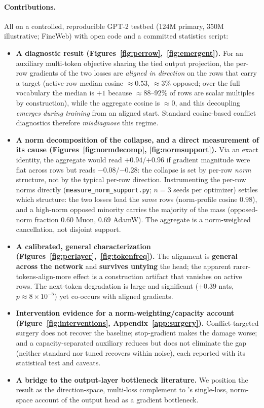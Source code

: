 \documentclass{article}
\begin{document}
\paragraph{Contributions.} All on a controlled, reproducible GPT-2 testbed (124M
primary, 350M illustrative; FineWeb) with open code and a committed statistics
script:
\begin{itemize}
\item \textbf{A diagnostic result (Figures~\ref{fig:perrow},~\ref{fig:emergent}).}
  For an auxiliary multi-token objective sharing the tied output projection, the
  per-row gradients of the two losses are \emph{aligned in direction} on the rows
  that carry a target (active-row median cosine ${\approx}0.53$, ${\approx}3\%$
  opposed; over the full vocabulary the median is $+1$ because ${\approx}88$--$92\%$
  of rows are scalar multiples by construction), while the aggregate cosine is
  $\approx 0$, and this decoupling \emph{emerges during training} from an aligned
  start. Standard cosine-based conflict diagnostics therefore \emph{misdiagnose}
  this regime.
\item \textbf{A norm decomposition of the collapse, and a direct measurement of
  its cause (Figures~\ref{fig:normdecomp}, \ref{fig:normsupport}).} Via an exact
  identity, the aggregate would read $+0.94$/$+0.96$ if gradient magnitude were
  flat across rows but reads $-0.08$/$-0.28$: the collapse is set by per-row
  \emph{norm} structure, not by the typical per-row direction. Instrumenting the
  per-row norms directly (\texttt{measure\_norm\_support.py}; $n{=}3$ seeds per
  optimizer) settles which structure: the two losses load the \emph{same} rows
  (norm-profile cosine $0.98$), and a high-norm opposed minority carries the
  majority of the mass (opposed-norm fraction $0.60$ Muon, $0.69$ AdamW). The
  aggregate is a norm-weighted cancellation, not disjoint support.
\item \textbf{A calibrated, general characterization
  (Figures~\ref{fig:perlayer},~\ref{fig:tokenfreq}).} The alignment is
  \textbf{general across the network} and \textbf{survives untying} the head; the
  apparent rarer-tokens-align-more effect is a construction artifact that vanishes
  on active rows. The next-token degradation is large and
  significant ($+0.39$ nats, $p\approx 8\times10^{-5}$) yet co-occurs with aligned
  gradients.
\item \textbf{Intervention evidence for a norm-weighting/capacity account
  (Figure~\ref{fig:interventions}, Appendix~\ref{app:surgery}).}
  Conflict-targeted surgery does not recover the baseline; stop-gradient makes the
  damage worse; and a capacity-separated auxiliary reduces but does not eliminate
  the gap (neither standard nor tuned recovers within noise), each reported with
  its statistical test and caveats.
\item \textbf{A bridge to the output-layer bottleneck literature.} We position the
  result as the direction-space, multi-loss complement to
  \citet{godey2026lmhead}'s single-loss, norm-space account of the output head as
  a gradient bottleneck.
\end{itemize}
\end{document}
